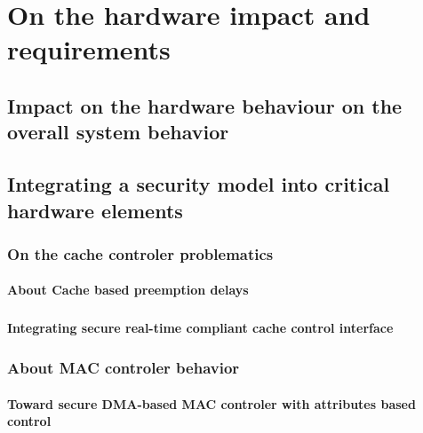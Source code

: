 ﻿%

\chapter{On the hardware impact and requirements}

\doMinitoc

\section{Impact on the hardware behaviour on the overall system behavior}

\section{Integrating a security model into critical hardware elements}

\subsection{On the cache controler problematics}

\subsubsection{About Cache based preemption delays}

\paragraph{}

\subsubsection{Integrating secure real-time compliant cache control interface}

\paragraph{}

\subsection{About MAC controler behavior}

\subsubsection{Toward secure DMA-based MAC controler with attributes based control}

\paragraph{}
